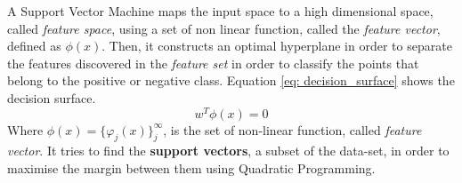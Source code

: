 \documentclass[11pt]{article}
\begin{document}
A Support Vector Machine maps the input space to a high dimensional space, called \emph{feature space}, using a set of non linear function, 
called the \emph{feature vector}, defined as $\phi(x)$. Then, it constructs an optimal hyperplane in order to separate the features discovered in the \emph{feature set}
in order to classify the points that belong to the positive or negative class. Equation \ref{eq: decision_surface} shows the decision surface.
\begin{equation}
    w^T\phi(x)= 0	
        \label{eq: decision_surface}
\end{equation}
Where $\phi(x) = \{\varphi_j(x)\}_j^{\infty}$, is the set of non-linear function, called \emph{feature vector}. It tries to find the \textbf{support vectors}, a subset of the data-set, in order to maximise the margin between them using Quadratic Programming.
\end{document}
